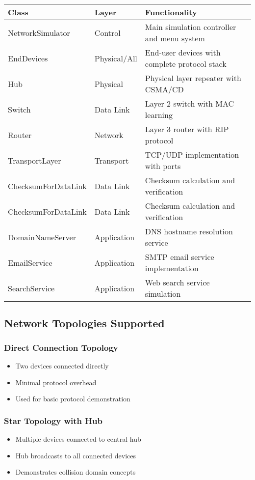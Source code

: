 \documentclass[12pt,a4paper]{article}
\begin{document}
\begin{longtable}{|p{3cm}|p{4cm}|p{6cm}|}
\hline
\textbf{Class} & \textbf{Layer} & \textbf{Functionality} \\
\hline
\endhead
NetworkSimulator & Control & Main simulation controller and menu system \\
\hline
EndDevices & Physical/All & End-user devices with complete protocol stack \\
\hline
Hub & Physical & Physical layer repeater with CSMA/CD \\
\hline
Switch & Data Link & Layer 2 switch with MAC learning \\
\hline
Router & Network & Layer 3 router with RIP protocol \\
\hline
TransportLayer & Transport & TCP/UDP implementation with ports \\
\hline
ChecksumForDataLink & Data Link & Checksum calculation and verification \\
\hline
ChecksumForDataLink & Data Link & Checksum calculation and verification \\
\hline
DomainNameServer & Application & DNS hostname resolution service \\
\hline
EmailService & Application & SMTP email service implementation \\
\hline
SearchService & Application & Web search service simulation \\
\hline
\end{longtable}

\subsection{Network Topologies Supported}

\subsubsection{Direct Connection Topology}
\begin{itemize}
\item Two devices connected directly
\item Minimal protocol overhead
\item Used for basic protocol demonstration
\end{itemize}

\subsubsection{Star Topology with Hub}
\begin{itemize}
\item Multiple devices connected to central hub
\item Hub broadcasts to all connected devices
\item Demonstrates collision domain concepts
\end{itemize}
\end{document}

